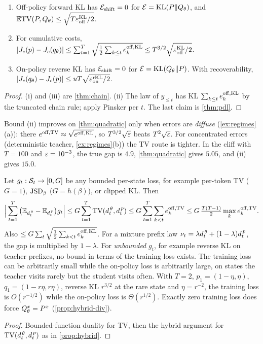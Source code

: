 \begin{theorem}\label{thm:kl-compounding}
\Pv
\begin{enumerate}[label=(\roman*),nosep]
\item Off-policy forward KL has $\mathcal{E}_{\mathrm{shift}}=0$ for $\mathcal{E}=\mathrm{KL}(P\|Q_\theta)$, and $\mathbb{E}\mathrm{TV}(P,Q_\theta)\le\sqrt{T\varepsilon_{\mathrm{off}}^{\mathrm{KL}}/2}$.
\item For cumulative costs,
$|J_c(p)-J_c(q_\theta)|\le\sum_{t=1}^T\sqrt{\tfrac12\sum_{k\le t}e^{\mathrm{off},\mathrm{KL}}_k}\le T^{3/2}\sqrt{\varepsilon_{\mathrm{off}}^{\mathrm{KL}}/2}$.
\item On-policy reverse KL has $\mathcal{E}_{\mathrm{shift}}=0$ for $\mathcal{E}=\mathrm{KL}(Q_\theta\|P)$. With recoverability,
$|J_c(q_\theta)-J_c(p)|\le uT\sqrt{\varepsilon_{\mathrm{on}}^{\mathrm{rKL}}/2}$.
\end{enumerate}
\end{theorem}
\begin{proof}
(i) and (iii) are \cref{thm:chain}. (ii) The law of $y_{\le t}$ has KL $\sum_{k\le t}e^{\mathrm{off},\mathrm{KL}}_k$ by
the truncated chain rule; apply Pinsker per $t$. The last claim is \cref{thm:pdl}.
\end{proof}
\noindent
Bound (ii) improves on \cref{thm:quadratic} only when errors are \emph{diffuse} (\cref{ex:regimes}(a)): there
$e^{\mathrm{off},\mathrm{TV}}\approx\sqrt{e^{\mathrm{off},\mathrm{KL}}}$, so $T^{3/2}\sqrt{\varepsilon}$ beats $T^2\sqrt{\varepsilon}$. For concentrated errors (deterministic
teacher, \cref{ex:regimes}(b)) the TV route is tighter. In the cliff with $T=100$ and $\varepsilon=10^{-3}$, the true
gap is $4.9$, \cref{thm:quadratic} gives $5.05$, and (ii) gives $15.0$.

\begin{proposition}\label{prop:exposure}
\Pv\Ck Let $g_t:\mathcal{S}_t\to[0,G]$ be any bounded per-state loss, for example per-token TV ($G=1$),
$\mathrm{JSD}_\beta$ ($G=h(\beta)$), or clipped KL. Then
\[
\Big|\sum_{t=1}^T\big(\mathbb{E}_{d^{\,\theta}_{t}}-\mathbb{E}_{d^{\,p}_{t}}\big)g_t\Big|\le G\sum_{t=1}^T\mathrm{TV}(d^{\,\theta}_{t},d^{\,p}_{t})
\le G\sum_{t=1}^T\sum_{k<t}e^{\mathrm{off},\mathrm{TV}}_k\le G\,\tfrac{T(T-1)}2\max_ke^{\mathrm{off},\mathrm{TV}}_k.
\]
Also $\le G\sum_t\sqrt{\frac12\sum_{k<t}e^{\mathrm{off},\mathrm{KL}}_k}$. For a mixture prefix law
$\nu_t=\lambda d^{\,\theta}_{t}+(1-\lambda)d^{\,p}_{t}$, the gap is multiplied by $1-\lambda$. For \emph{unbounded} $g_t$,
for example reverse KL on teacher prefixes, no bound in terms of the training loss exists. The training
loss can be arbitrarily small while the on-policy loss is arbitrarily large, on states the teacher visits
rarely but the student visits often. With $T=2$, $p_1=(1-\eta,\eta)$, $q_1=(1-r\eta,r\eta)$, reverse KL $r^{3/2}$ at the
rare state and $\eta=r^{-2}$, the training loss is $O(r^{-1/2})$ while the on-policy loss is $\Theta(r^{1/2})$. Exactly
zero training loss does force $Q^x_\theta=P^{x}$ (\cref{prop:hybrid-div}).
\end{proposition}
\begin{proof}
Bounded-function duality for TV, then the hybrid argument for $\mathrm{TV}(d^{\,\theta}_{t},d^{\,p}_{t})$ as in \cref{prop:hybrid}.
\end{proof}


